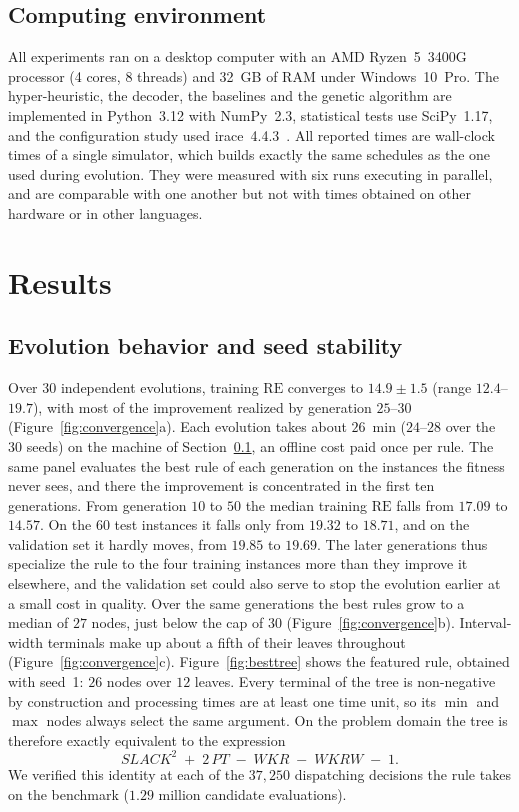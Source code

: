 \documentclass[preprint,number,sort&compress,12pt]{elsarticle}
\newcommand{\RE}{\mathrm{RE}}
\begin{document}
\subsection{Computing environment}
\label{sec:env}
All experiments ran on a desktop computer with an AMD Ryzen~5~3400G
processor (4 cores, 8 threads) and 32~GB of RAM under Windows~10~Pro.
The hyper-heuristic, the decoder, the baselines and the genetic
algorithm are implemented in Python~3.12 with NumPy~2.3, statistical
tests use SciPy~1.17, and the configuration study used
irace~4.4.3~\citep{LopezIbanez2016}. All reported times are wall-clock times of a single
simulator, which builds exactly the same schedules as the one used
during evolution. They were measured with six runs executing in
parallel, and are comparable with one another but not with times
obtained on other hardware or in other languages.

\section{Results}
\label{sec:results}


\subsection{Evolution behavior and seed stability}
Over 30 independent evolutions, training $\RE$ converges to
$14.9 \pm 1.5$ (range $12.4$--$19.7$), with most of the improvement
realized by generation $25$--$30$ (Figure~\ref{fig:convergence}a).
Each evolution takes about $26$~min ($24$--$28$ over the 30 seeds) on the
machine of Section~\ref{sec:env}, an offline cost paid once per rule.
The same panel evaluates the best rule of each generation on the
instances the fitness never sees, and there the improvement is
concentrated in the first ten generations. From generation $10$ to $50$
the median training $\RE$ falls from $17.09$ to $14.57$. On the $60$
test instances it falls only from $19.32$ to $18.71$, and on the
validation set it hardly moves, from $19.85$ to $19.69$. The later
generations thus specialize the rule to the four training instances more
than they improve it elsewhere, and the validation set could also serve
to stop the evolution earlier at a small cost in quality. Over the same
generations the best rules grow to a median of $27$ nodes, just below
the cap of $30$ (Figure~\ref{fig:convergence}b). Interval-width
terminals make up about a fifth of their leaves throughout
(Figure~\ref{fig:convergence}c).
Figure~\ref{fig:besttree}
shows the featured rule, obtained with seed~1: $26$ nodes
over $12$ leaves. Every terminal of the tree is non-negative by
construction and processing times are at least one time unit, so its
$\min$ and $\max$ nodes always select the same argument. On the
problem domain the tree is therefore exactly equivalent to the
expression
\begin{equation}
\mathit{SLACK}^{2} \;+\; 2\,\mathit{PT}
\;-\; \mathit{WKR} \;-\; \mathit{WKRW} \;-\; 1 .
\label{eq:besttree}
\end{equation}
We verified this identity at each of the $37{,}250$ dispatching decisions
the rule takes on the benchmark ($1.29$ million candidate evaluations).
\end{document}
